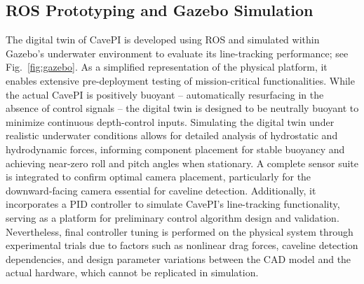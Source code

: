\subsection{ROS Prototyping and Gazebo Simulation}
The digital twin of CavePI is developed using ROS and simulated within Gazebo’s underwater environment to evaluate its line-tracking performance; see Fig.~\ref{fig:gazebo}. As a simplified representation of the physical platform, it enables extensive pre-deployment testing of mission-critical functionalities. While the actual CavePI is positively buoyant -- automatically resurfacing in the absence of control signals -- the digital twin is designed to be neutrally buoyant to minimize continuous depth-control inputs. Simulating the digital twin under realistic underwater conditions allows for detailed analysis of hydrostatic and hydrodynamic forces, informing component placement for stable buoyancy and achieving near-zero roll and pitch angles when stationary. A complete sensor suite is integrated to confirm optimal camera placement, particularly for the downward-facing camera essential for caveline detection. Additionally, it incorporates a PID controller to simulate CavePI’s line-tracking functionality, serving as a platform for preliminary control algorithm design and validation. Nevertheless, final controller tuning is performed on the physical system through experimental trials due to factors such as nonlinear drag forces, caveline detection dependencies, and design parameter variations between the CAD model and the actual hardware, which cannot be replicated in simulation.












